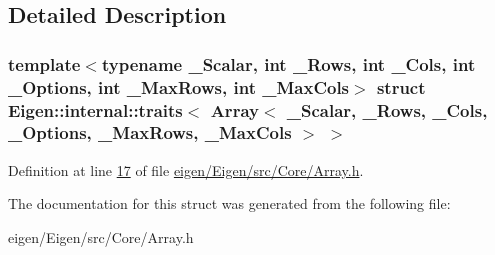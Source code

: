 \subsection{Detailed Description}
\subsubsection*{template$<$typename \+\_\+\+Scalar, int \+\_\+\+Rows, int \+\_\+\+Cols, int \+\_\+\+Options, int \+\_\+\+Max\+Rows, int \+\_\+\+Max\+Cols$>$\newline
struct Eigen\+::internal\+::traits$<$ Array$<$ \+\_\+\+Scalar, \+\_\+\+Rows, \+\_\+\+Cols, \+\_\+\+Options, \+\_\+\+Max\+Rows, \+\_\+\+Max\+Cols $>$ $>$}



Definition at line \hyperlink{eigen_2_eigen_2src_2_core_2_array_8h_source_l00017}{17} of file \hyperlink{eigen_2_eigen_2src_2_core_2_array_8h_source}{eigen/\+Eigen/src/\+Core/\+Array.\+h}.



The documentation for this struct was generated from the following file\+:\begin{DoxyCompactItemize}
\item 
eigen/\+Eigen/src/\+Core/\+Array.\+h\end{DoxyCompactItemize}
